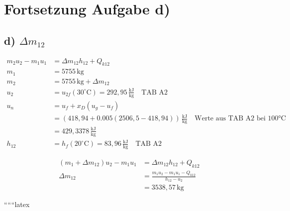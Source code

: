 \section*{Fortsetzung Aufgabe d)}

\subsection*{d) $\Delta m_{12}$}

\begin{align*}
m_2 u_2 - m_1 u_1 &= \Delta m_{12} h_{12} + Q_{k12} \\
m_1 &= 5755 \, \text{kg} \\
m_2 &= 5755 \, \text{kg} + \Delta m_{12} \\
u_2 &= u_{2f} (30^\circ \text{C}) = 292,95 \, \frac{\text{kJ}}{\text{kg}} \quad \text{TAB A2} \\
u_n &= u_f + x_D (u_g - u_f) \\
&= (418,94 + 0.005 (2506,5 - 418,94)) \, \frac{\text{kJ}}{\text{kg}} \quad \text{Werte aus TAB A2 bei 100°C} \\
&= 429,3378 \, \frac{\text{kJ}}{\text{kg}} \\
h_{12} &= h_f (20^\circ \text{C}) = 83,96 \, \frac{\text{kJ}}{\text{kg}} \quad \text{TAB A2}
\end{align*}

\begin{align*}
(m_1 + \Delta m_{12}) u_2 - m_1 u_1 &= \Delta m_{12} h_{12} + Q_{k12} \\
\Delta m_{12} &= \frac{m_1 u_2 - m_1 u_1 - Q_{k12}}{h_{12} - u_2} \\
&= 3538,57 \, \text{kg}
\end{align*}

``````latex